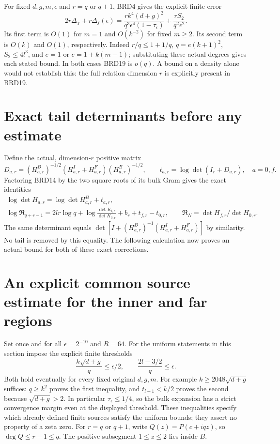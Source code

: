 For fixed $d,g,m,\epsilon$ and $r=q$ or $q+1$, BRD4 gives
the explicit finite error
\[
 2r\Delta_\chi+r\Delta_f(\epsilon)
 =\frac{r k^4(d+g)^2}{q^3\epsilon^4(1-\tau_\epsilon)}
   +\frac{rS_2}{q^2\epsilon^2}.\tag{BRD19}
\]
Its first term is $O(1)$ for $m=1$ and $O(k^{-2})$ for fixed
$m\geq2$. Its second term is $O(k)$ and $O(1)$, respectively.
Indeed $r/q\leq1+1/q$, $q=e(k+1)^2$,
$S_2\leq4l^3$, and $e=1$ or $e=1+k(m-1)$; substituting these
actual degrees gives each stated bound. In both cases BRD19
is $o(q)$. A bound on a density alone would not establish this:
the full relation dimension $r$ is explicitly present in BRD19.

\section{Exact tail determinants before any estimate}

Define the actual, dimension-$r$ positive matrix
\[
 D_{a,r}=(H_{a,r}^B)^{-1/2}
       (H_{a,r}^I+H_{a,r}^F)(H_{a,r}^B)^{-1/2},
 \qquad t_{a,r}=\log\det(I_r+D_{a,r}),\quad a=0,f.
\tag{BRD20}
\]
Factoring BRD14 by the two square roots of its bulk Gram gives
the exact identities
\[
\begin{gathered}
 \log\det H_{a,r}=\log\det H_{a,r}^B+t_{a,r},\\
 \log\mathfrak R_{q+r-1}
  =2lr\log q+\log\frac{\det K_{l,r}}{\det K_{0,r}}
                         +b_r+t_{f,r}-t_{0,r},
 \qquad\mathfrak R_N=\det H_{f,r}/\det H_{0,r}.
\end{gathered}\tag{BRD21}
\]
The same determinant equals
$\det[I+(H_{a,r}^B)^{-1}(H_{a,r}^I+H_{a,r}^F)]$ by similarity.
No tail is removed by this equality. The following calculation
now proves an actual bound for both of these exact corrections.

\section{An explicit common source estimate for the inner and far regions}

Set once and for all $\epsilon=2^{-10}$ and $R=64$. For the
uniform statements in this section impose the explicit finite
thresholds
\[
 \frac{k\sqrt{d+g}}q\leq\epsilon/2,\qquad
 \frac{2l-3/2}{q}\leq\epsilon.\tag{BRD22}
\]
Both hold eventually for every fixed original $d,g,m$. For
example $k\geq2048\sqrt{d+g}$ suffices: $q\geq k^2$ proves
the first inequality, and $t_{l-1}<k/2$ proves the second
because $\sqrt{d+g}>2$. In particular
$\tau_\epsilon\leq1/4$, so the bulk expansion has a strict
convergence margin even at the displayed threshold. These inequalities
specify which already defined finite sources satisfy the uniform
bounds; they assert no property of a zeta zero. For $r=q$ or
$q+1$, write $Q(z)=P(c+iqz)$, so $\deg Q\leq r-1\leq q$.
The positive subsegment $1\leq z\leq2$ lies inside $B$.

